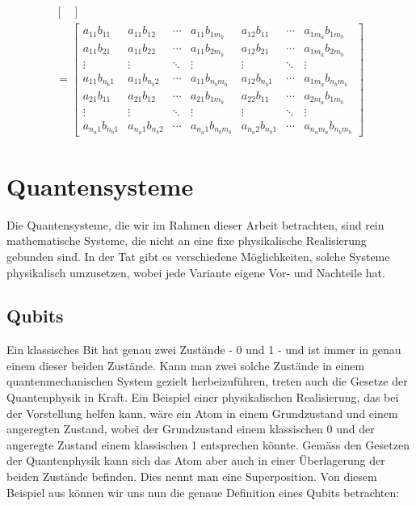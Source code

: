 \begin{align*}
\begin{bmatrix}
    \end{bmatrix} \\
    =
    \begin{bmatrix}
        a_{11}b_{11} & a_{11}b_{12} & \cdots & a_{11}b_{1m_b} & a_{12}b_{11} & \cdots & a_{1m_a}b_{1m_b} \\
        a_{11}b_{21} & a_{11}b_{22} & \cdots & a_{11}b_{2m_b} & a_{12}b_{21} & \cdots & a_{1m_a}b_{2m_b} \\
        \vdots & \vdots & \ddots & \vdots & \vdots & \ddots & \vdots \\
        a_{11}b_{n_b1} & a_{11}b_{n_b2} & \cdots & a_{11}b_{n_bm_b} & a_{12}b_{n_b1} & \cdots & a_{1m_a}b_{n_bm_b} \\ 
        a_{21}b_{11} & a_{21}b_{12} & \cdots & a_{21}b_{1m_b} & a_{22}b_{11} & \cdots & a_{2m_a}b_{1m_b} \\
        \vdots & \vdots & \ddots & \vdots & \vdots & \ddots & \vdots \\
        a_{n_a1}b_{n_b1} & a_{n_a1}b_{n_b2} & \cdots & a_{n_a1}b_{n_bm_b} & a_{n_a2}b_{n_b1} & \cdots & a_{n_am_a}b_{n_bm_b}
    \end{bmatrix}
\end{align*}

\section{Quantensysteme}
Die Quantensysteme, die wir im Rahmen dieser Arbeit betrachten, sind rein mathematische Systeme, die nicht an eine fixe physikalische Realisierung gebunden sind. In der Tat gibt es verschiedene Möglichkeiten, solche Systeme physikalisch umzusetzen, wobei jede Variante eigene Vor- und Nachteile hat.

\subsection{Qubits}
Ein klassisches Bit hat genau zwei Zustände - 0 und 1 - und ist immer in genau einem dieser beiden Zustände. Kann man  zwei solche Zustände in einem quantenmechanischen System gezielt herbeizuführen, treten auch die Gesetze der Quantenphysik in Kraft. Ein Beispiel einer physikalischen Realisierung, das bei der Vorstellung helfen kann, wäre ein Atom in einem Grundzustand und einem angeregten Zustand, wobei der Grundzustand einem klassischen 0 und der angeregte Zustand einem klassischen 1 entsprechen könnte. Gemäss den Gesetzen der Quantenphysik kann sich das Atom aber auch in einer Überlagerung der beiden Zustände befinden. Dies nennt man eine Superposition. Von diesem Beispiel aus können wir uns nun die genaue Definition eines Qubits betrachten:
